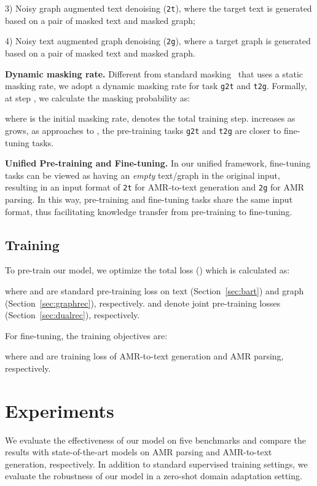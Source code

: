 \documentclass[11pt]{article}
\begin{document}
3) Noisy graph augmented text denoising (\texttt{2t}), where the target text is generated based on a pair of masked text and masked graph;

4) Noisy text augmented graph denoising (\texttt{2g}), where a target graph is generated based on a pair of masked text and masked graph.



\noindent\textbf{Dynamic masking rate.} Different from standard masking~\cite{devlin-etal-2019-bert} that uses a static masking rate, we adopt a dynamic masking rate  for task \texttt{g2t} and \texttt{t}\texttt{2g}. 
Formally, at step , we calculate the masking probability  as:

where  is the initial masking rate,  denotes the total training step. 
 increases as  grows, as  approaches to , the pre-training tasks \texttt{g2t} and \texttt{t}\texttt{2g} are closer to fine-tuning tasks.

\noindent\textbf{Unified Pre-training and Fine-tuning.} 
In our unified framework, fine-tuning tasks can be viewed as having an \textit{empty} text/graph in the original input, resulting in an input format of \texttt{2t} for AMR-to-text generation and \texttt{2g} for AMR parsing.
In this way, pre-training and fine-tuning tasks share the same input format, thus facilitating knowledge transfer from pre-training to fine-tuning.

\subsection{Training}
To pre-train our model, we optimize the total loss () which is calculated as:

where  and  are standard pre-training loss on text (Section~\ref{sec:bart}) and graph (Section~\ref{sec:graphrec}), respectively. 
 and  denote joint pre-training losses (Section~\ref{sec:dualrec}), respectively.

For fine-tuning, the training objectives are:

where  and  are training loss of AMR-to-text generation and AMR parsing, respectively.
\section{Experiments}
We evaluate the effectiveness of our model on five benchmarks and compare the results with state-of-the-art models on AMR parsing and AMR-to-text generation, respectively.
In addition to standard supervised training settings, we evaluate the robustness of our model in a zero-shot domain adaptation setting. 
\end{document}
